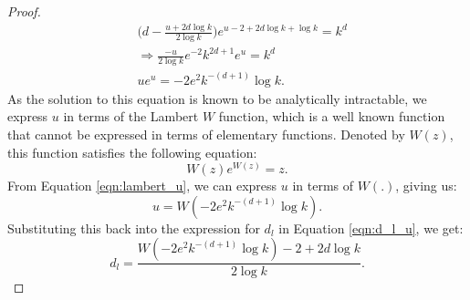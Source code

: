 \begin{proof}
\begin{align}
    &\Big(d - \frac{u + 2d \log k}{2 \log k}\Big)e^{u-2+2d\log k + \log k} = k^d\\ 
    & \Rightarrow \frac{-u}{2\log k}e^{-2}k^{2d+1} e^u = k^d\\
    \label{eqn:lambert_u} & ue^u = -2e^2k^{-(d+1)}\log k. 
\end{align}
As the solution to this equation is known to be analytically intractable, we express $u$ in terms of the Lambert $W$ function, which is a well known function that cannot be expressed in terms of elementary functions. Denoted by $W(z)$, this function satisfies the following equation:
\begin{equation}
    \label{eqn:lambert}
    W(z)e^{W(z)} = z.
\end{equation}
From Equation \ref{eqn:lambert_u}, we can express $u$ in terms of $W(.)$, giving us:
\begin{equation}
    u = W(-2e^2k^{-(d+1)}\log k).
\end{equation}
Substituting this back into the expression for $d_l$ in Equation \ref{eqn:d_l_u}, we get:
\begin{equation}
    \label{eqn:d_l_in_lambert_form}
    d_l = \frac{W(-2e^2k^{-(d+1)}\log k) - 2+2d\log k}{2\log k}.
\end{equation}

\end{proof}
